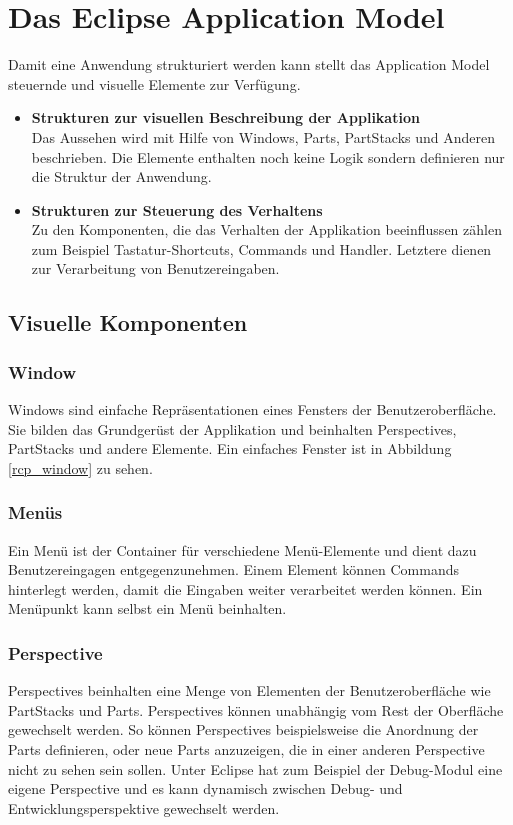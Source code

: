 \section{Das Eclipse Application Model}

Damit eine Anwendung strukturiert werden kann stellt das Application Model steuernde und visuelle Elemente zur Verfügung.
\begin{itemize}

\item \textbf{Strukturen zur visuellen Beschreibung der Applikation}\\
	Das Aussehen wird mit Hilfe von Windows, Parts, PartStacks und Anderen beschrieben. Die Elemente enthalten noch keine Logik sondern definieren nur die Struktur der Anwendung.


\item \textbf{Strukturen zur Steuerung des Verhaltens}\\
	 Zu den Komponenten, die das Verhalten der Applikation beeinflussen zählen zum Beispiel Tastatur-Shortcuts, Commands und Handler. Letztere dienen zur Verarbeitung von Benutzereingaben.

\end{itemize}

\subsection{Visuelle Komponenten}

\subsubsection{Window}
Windows sind einfache Repräsentationen eines Fensters der Benutzeroberfläche\cite[org.eclipse.e4.ui.model.application.ui.basic]{eclipse:help}. Sie bilden das Grundgerüst der Applikation und beinhalten Perspectives, PartStacks und andere Elemente. Ein einfaches Fenster ist in Abbildung \ref{rcp_window} zu sehen.

\subsubsection{Menüs}
Ein Menü ist der Container für verschiedene Menü-Elemente und dient dazu Benutzereingagen entgegenzunehmen. Einem Element können Commands hinterlegt werden, damit die Eingaben weiter verarbeitet werden können. Ein Menüpunkt kann selbst ein Menü beinhalten.

\subsubsection{Perspective}
Perspectives beinhalten eine Menge von Elementen der Benutzeroberfläche wie PartStacks und Parts. Perspectives können unabhängig vom Rest der Oberfläche gewechselt werden\cite[org.eclipse.e4.ui.model.application.ui.advanced]{eclipse:help}. So können Perspectives beispielsweise die Anordnung der Parts definieren, oder neue Parts anzuzeigen, die in einer anderen Perspective nicht zu sehen sein sollen. Unter Eclipse hat zum Beispiel der Debug-Modul eine eigene Perspective und es kann dynamisch zwischen Debug- und Entwicklungsperspektive gewechselt werden.

